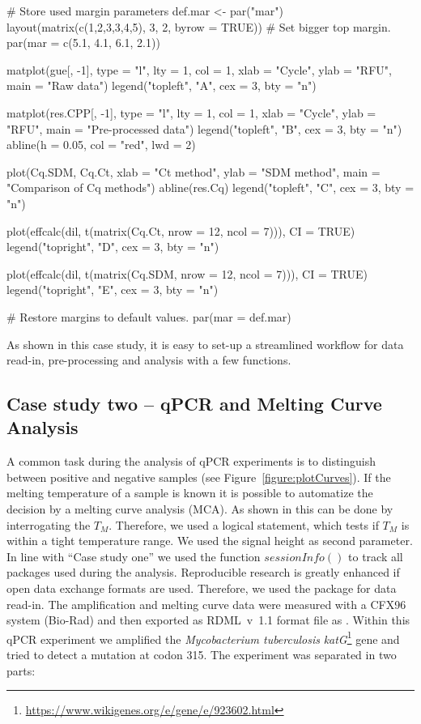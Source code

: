 \begin{example}
# Store used margin parameters
def.mar <- par("mar")
layout(matrix(c(1,2,3,3,4,5), 3, 2, byrow = TRUE))
# Set bigger top margin.
par(mar = c(5.1, 4.1, 6.1, 2.1))

matplot(gue[, -1], type = "l", lty = 1, col = 1, xlab = "Cycle", 
	    ylab = "RFU", main = "Raw data")
legend("topleft", "A", cex = 3, bty = "n")

matplot(res.CPP[, -1], type = "l", lty = 1, col = 1, xlab = "Cycle", 
	ylab = "RFU", main = "Pre-processed data")
legend("topleft", "B", cex = 3, bty = "n")
abline(h = 0.05, col = "red", lwd = 2)

plot(Cq.SDM, Cq.Ct, xlab = "Ct method", ylab = "SDM method", 
     main = "Comparison of Cq methods")
abline(res.Cq)
legend("topleft", "C", cex = 3, bty = "n")

plot(effcalc(dil, t(matrix(Cq.Ct, nrow = 12, ncol = 7))), CI = TRUE)
legend("topright", "D", cex = 3, bty = "n")

plot(effcalc(dil, t(matrix(Cq.SDM, nrow = 12, ncol = 7))), CI = TRUE)
legend("topright", "E", cex = 3, bty = "n")

# Restore margins to default values.
par(mar = def.mar)
\end{example}

As shown in this case study, it is easy to set-up a streamlined workflow for 
data 
read-in, pre-processing and analysis with a few functions.

\subsection{Case study two -- qPCR and Melting Curve Analysis}

A common task during the analysis of qPCR experiments is to distinguish between 
positive and negative samples (see Figure~\ref{figure:plotCurves}). If the 
melting temperature of a sample is known it is possible to automatize the 
decision by a melting curve analysis (MCA). As shown in \citet{roediger_RJ_2013} 
this can be done by interrogating the $T_{M}$. Therefore, we used a logical 
statement, which tests if $T_{M}$ is within a tight temperature range. We used 
the signal height as second parameter. In line with ``Case study one'' we used 
the function $sessionInfo()$ to track all packages used during the analysis. 
Reproducible research is greatly enhanced if open data exchange formats are 
used. Therefore, we used the  package for data read-in. The 
amplification and melting curve data were measured with a CFX96 system (Bio-Rad) 
and then exported as RDML~v~1.1 format file as . 
Within this qPCR experiment we amplified the \textit{Mycobacterium tuberculosis} 
\textit{katG}\footnote{\url{https://www.wikigenes.org/e/gene/e/923602.html}} 
gene and tried to detect a mutation at codon 315. The experiment was separated 
in two parts:

